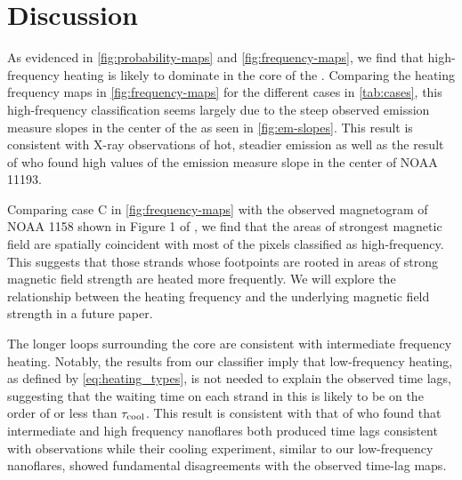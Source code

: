 \section{Discussion}\label{sec:discussion}

As evidenced in \autoref{fig:probability-maps} and \autoref{fig:frequency-maps}, we find that high-frequency heating is likely to dominate in the core of the \AR. 
Comparing the heating frequency maps in \autoref{fig:frequency-maps} for the different cases in \autoref{tab:cases}, this high-frequency classification seems largely due to the steep observed emission measure slopes in the center of the \AR{} as seen in \autoref{fig:em-slopes}.
This result is consistent with X-ray observations of hot, steadier emission \citep{warren_evidence_2010,warren_constraints_2011,winebarger_using_2011} as well as the result of \citet{del_zanna_evolution_2015} who found high values of the emission measure slope in the center of NOAA 11193.

Comparing case C in \autoref{fig:frequency-maps} with the observed magnetogram of NOAA 1158 shown in Figure 1 of , we find that the areas of strongest magnetic field are spatially coincident with most of the pixels classified as high-frequency.
This suggests that those strands whose footpoints are rooted in areas of strong magnetic field strength are heated more frequently.
We will explore the relationship between the heating frequency and the underlying magnetic field strength in a future paper.

The longer loops surrounding the core are consistent with intermediate frequency heating.
Notably, the results from our classifier imply that low-frequency heating, as defined by \autoref{eq:heating_types}, is not needed to explain the observed time lags, suggesting that the waiting time on each strand in this \AR{} is likely to be on the order of or less than $\tau_\textup{cool}$.
This result is consistent with that of \citet{bradshaw_patterns_2016} who found that intermediate and high frequency nanoflares both produced time lags consistent with observations while their cooling experiment, similar to our low-frequency nanoflares, showed fundamental disagreements with the observed time-lag maps.

